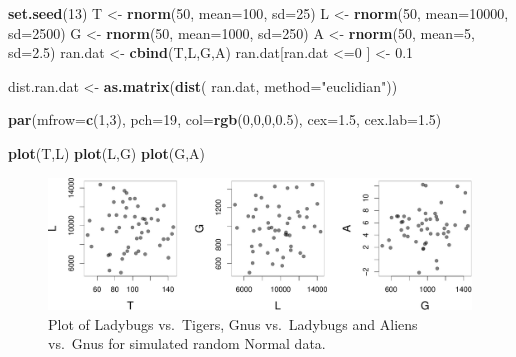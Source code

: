 \documentclass[twocolumn]{article}
\newenvironment{Shaded}{\begin{snugshade}}{\end{snugshade}}
\newcommand{\KeywordTok}[1]{\textcolor[rgb]{0.13,0.29,0.53}{\textbf{{#1}}}}
\newcommand{\DataTypeTok}[1]{\textcolor[rgb]{0.13,0.29,0.53}{{#1}}}
\newcommand{\DecValTok}[1]{\textcolor[rgb]{0.00,0.00,0.81}{{#1}}}
\newcommand{\FloatTok}[1]{\textcolor[rgb]{0.00,0.00,0.81}{{#1}}}
\newcommand{\StringTok}[1]{\textcolor[rgb]{0.31,0.60,0.02}{{#1}}}
\newcommand{\NormalTok}[1]{{#1}}
\begin{document}
\begin{Shaded}
\begin{Highlighting}[]
\KeywordTok{set.seed}\NormalTok{(}\DecValTok{13}\NormalTok{)}
\NormalTok{T <-}\StringTok{ }\KeywordTok{rnorm}\NormalTok{(}\DecValTok{50}\NormalTok{, }\DataTypeTok{mean=}\DecValTok{100}\NormalTok{, }\DataTypeTok{sd=}\DecValTok{25}\NormalTok{)}
\NormalTok{L <-}\StringTok{ }\KeywordTok{rnorm}\NormalTok{(}\DecValTok{50}\NormalTok{, }\DataTypeTok{mean=}\DecValTok{10000}\NormalTok{, }\DataTypeTok{sd=}\DecValTok{2500}\NormalTok{)}
\NormalTok{G <-}\StringTok{ }\KeywordTok{rnorm}\NormalTok{(}\DecValTok{50}\NormalTok{, }\DataTypeTok{mean=}\DecValTok{1000}\NormalTok{, }\DataTypeTok{sd=}\DecValTok{250}\NormalTok{)}
\NormalTok{A <-}\StringTok{ }\KeywordTok{rnorm}\NormalTok{(}\DecValTok{50}\NormalTok{, }\DataTypeTok{mean=}\DecValTok{5}\NormalTok{, }\DataTypeTok{sd=}\FloatTok{2.5}\NormalTok{)}
\NormalTok{ran.dat <-}\StringTok{ }\KeywordTok{cbind}\NormalTok{(T,L,G,A)}
\NormalTok{ran.dat[ran.dat <=}\DecValTok{0} \NormalTok{] <-}\StringTok{ }\FloatTok{0.1}

\NormalTok{dist.ran.dat <-}\StringTok{ }\KeywordTok{as.matrix}\NormalTok{(}\KeywordTok{dist}\NormalTok{(}
    \NormalTok{ran.dat, }\DataTypeTok{method=}\StringTok{"euclidian"}\NormalTok{))}

\KeywordTok{par}\NormalTok{(}\DataTypeTok{mfrow=}\KeywordTok{c}\NormalTok{(}\DecValTok{1}\NormalTok{,}\DecValTok{3}\NormalTok{), }\DataTypeTok{pch=}\DecValTok{19}\NormalTok{, }\DataTypeTok{col=}\KeywordTok{rgb}\NormalTok{(}\DecValTok{0}\NormalTok{,}\DecValTok{0}\NormalTok{,}\DecValTok{0}\NormalTok{,}\FloatTok{0.5}\NormalTok{),}
    \DataTypeTok{cex=}\FloatTok{1.5}\NormalTok{, }\DataTypeTok{cex.lab=}\FloatTok{1.5}\NormalTok{)}

\KeywordTok{plot}\NormalTok{(T,L)}
\KeywordTok{plot}\NormalTok{(L,G)}
\KeywordTok{plot}\NormalTok{(G,A)}
\end{Highlighting}
\end{Shaded}

\begin{figure}[htbp]
\centering
\includegraphics{main_files/figure-latex/R_block_random-1.pdf}
\caption{\label{numbers} Plot of Ladybugs vs.~Tigers, Gnus vs.~Ladybugs
and Aliens vs.~Gnus for simulated random Normal data.}
\end{figure}
\end{document}
